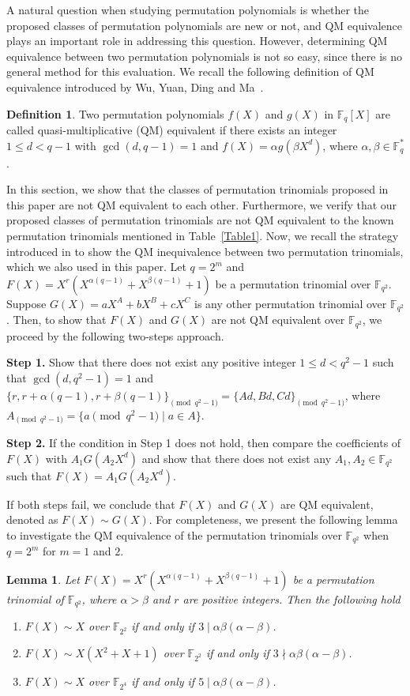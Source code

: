 \documentclass[12pt,reqno]{amsart}
\newtheorem{lem}[thm]{Lemma}
\numberwithin{equation}{section}
\theoremstyle{definition}
\newtheorem{defn}[thm]{Definition}
\newcommand{\F}{\mathbb F}
\begin{document}
A natural question when studying permutation polynomials is whether the proposed classes of permutation polynomials are new or not, and QM equivalence plays an important role in addressing this question. However, determining QM equivalence between two permutation polynomials is not so easy, since there is no general method for this evaluation. We recall the following definition of QM equivalence introduced by Wu, Yuan, Ding and Ma~\cite{wu2017permutation}. 
\begin{defn}{\label{equiv}}
Two permutation polynomials $f(X)$ and $g(X)$ in $\F_{q}[X]$ are called quasi-multiplicative (QM) equivalent if there exists an integer 
$1\leq d < q-1$ with $\gcd(d,q-1)=1$ and $f(X)= \alpha g(\beta X^d)$, where $\alpha,\beta\in\mathbb{F}_{q}^{*}$.
\end{defn}
In this section, we show that the classes of permutation trinomials proposed in this paper are not QM equivalent to each other. Furthermore, we verify that our proposed classes of permutation trinomials are not QM equivalent to the known permutation trinomials mentioned in Table~\ref{Table1}. Now, we recall the strategy introduced in \cite{tu2018class} to show the QM inequivalence between two permutation trinomials, which we also used in this paper.
Let $q=2^m$ and $F(X)=X^r(X^{\alpha(q-1)}+X^{\beta(q-1)}+1)$ be a permutation trinomial over $\F_{q^2}$. Suppose $G(X)=aX^{A}+bX^{B}+cX^{C}$ is any other permutation trinomial over $\F_{q^2}$. Then, to show that $F(X)$ and $G(X)$ are not QM equivalent over $\F_{q^2}$, we proceed by the following two-steps approach. 

\textbf{Step 1.} Show that there does not exist any positive integer $1\leq d < q^2-1$ such that $\gcd(d,q^2-1)=1$ and $\{r,r+\alpha(q-1),r+\beta(q-1)\}_{\pmod{q^2-1}}=\{Ad,Bd,Cd\}_{\pmod{q^2-1}}$, where $A_{\pmod{q^2-1}}=\{a \pmod{q^2-1} \mid a \in A\}$.

\textbf{Step 2.} If the condition in Step 1 does not hold, then compare the coefficients of $F(X)$ with $A_{1}G(A_{2}X^d)$ and show that there does not exist any $A_{1},A_{2}\in\mathbb{F}_{q^2}$ such that $F(X) = A_{1}G(A_{2}X^d)$.

If both steps fail, we conclude that $F(X)$ and $G(X)$ are QM equivalent, denoted as $F(X) \sim G(X)$. For completeness, we present the following lemma to investigate the QM equivalence of the permutation trinomials over $\F_{q^2}$ when $q=2^m$ for $m = 1$ and $2$.

\begin{lem}\label{L1}\cite[Theorem 4.2]{Harsh}
	Let $F(X) = X^r(X^{\alpha(q-1)} + X^{\beta(q-1)}+ 1)$ be a permutation trinomial of $\F_{q^2}$,
	where $\alpha > \beta$ and $r$ are positive integers. Then the following hold
	\begin{enumerate}
		\item $F(X) \sim X$ over $\F_{2^2}$ if and only if $3 \mid \alpha \beta (\alpha-\beta)$.
		\item $F(X) \sim X(X^2+X+1)$ over $\F_{2^2}$ if and only if $3  \nmid \alpha \beta (\alpha-\beta)$.
		\item $F(X) \sim X$ over $\F_{2^4}$ if and only if $5 \mid \alpha \beta (\alpha-\beta)$.
	\end{enumerate}
\end{lem}
\end{document}
